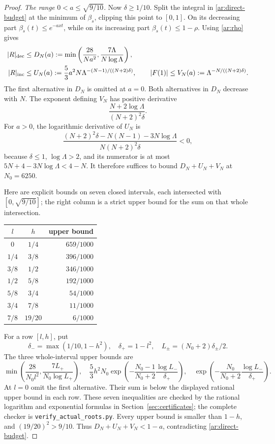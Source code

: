 \documentclass[11pt,reqno]{amsart}
\numberwithin{equation}{section}
\theoremstyle{definition}
\theoremstyle{remark}
\DeclareRobustCommand{\cert}[1]{\nolinkurl{#1}}
\begin{document}
\begin{proof}
\smallskip
\noindent\emph{The range $0<a\le\sqrt{9/10}$.}
Now $\delta\ge1/10$. Split the integral in
\eqref{ar:direct-budget} at the minimum of $\beta_s$, clipping this
point to $[0,1]$. On its decreasing part
$\beta_s(t)\le e^{-axt}$, while on its increasing part
$\beta_s(t)\le1-\rho$. Using \eqref{ar:rho} gives
\begin{align}
 |R|_{\rm dec}&\le D_N(a):=
 \min\left(\frac{28}{Na^2},\frac{7\Lambda}{N\log\Lambda}\right),
 \label{ar:D}\\
 |R|_{\rm inc}&\le U_N(a):=
 \frac53a^2N\Lambda^{-(N-1)/((N+2)\delta)},\qquad
 |F(1)|\le V_N(a):=\Lambda^{-N/((N+2)\delta)}.
 \label{ar:UV}
\end{align}
The first alternative in $D_N$ is omitted at $a=0$.
Both alternatives in $D_N$ decrease with $N$.  The exponent defining
$V_N$ has positive derivative
\[
 \frac{N+2\log\Lambda}{(N+2)^2\delta}.
\]
For $a>0$, the logarithmic derivative of $U_N$ is
\[
 \frac{(N+2)^2\delta-N(N-1)-3N\log\Lambda}
 {N(N+2)^2\delta}<0,
\]
because $\delta\le1$, $\log\Lambda>2$, and its numerator is at most
$5N+4-3N\log\Lambda<4-N$.
It therefore suffices to bound $D_N+U_N+V_N$ at $N_0=6250$.

Here are explicit bounds on seven closed intervals, each intersected
with $[0,\sqrt{9/10}]$; the right column is a strict upper bound
for the sum on that whole intersection.
\begin{center}
\begin{tabular}{ccr}
\toprule
$l$&$h$&upper bound\\\midrule
$0$&$1/4$&$659/1000$\\
$1/4$&$3/8$&$396/1000$\\
$3/8$&$1/2$&$346/1000$\\
$1/2$&$5/8$&$192/1000$\\
$5/8$&$3/4$&$54/1000$\\
$3/4$&$7/8$&$11/1000$\\
$7/8$&$19/20$&$6/1000$\\\bottomrule
\end{tabular}
\end{center}
For a row $[l,h]$, put
\[
 \delta_- =\max(1/10,1-h^2),\quad \delta_+=1-l^2,
 \quad L_\pm=(N_0+2)\delta_\pm/2.
\]
The three whole-interval upper bounds are
\[
 \min\left(\frac{28}{N_0l^2},\frac{7L_+}{N_0\log L_+}\right),\quad
 \frac53h^2N_0\exp\left(-\frac{N_0-1}{N_0+2}
                          \frac{\log L_-}{\delta_+}\right),\quad
 \exp\left(-\frac{N_0}{N_0+2}\frac{\log L_-}{\delta_+}\right).
\]
At $l=0$ omit the first alternative.  Their sum is below the displayed
rational upper bound in each row. These seven inequalities are checked
by the rational logarithm and exponential formulas in
Section~\ref{sec:certificates}; the complete checker is
\cert{verify_actual_roots.py}.  Every upper bound is smaller than
$1-h$, and $(19/20)^2>9/10$. Thus
$D_N+U_N+V_N<1-a$, contradicting \eqref{ar:direct-budget}.


\end{proof}
\end{document}
